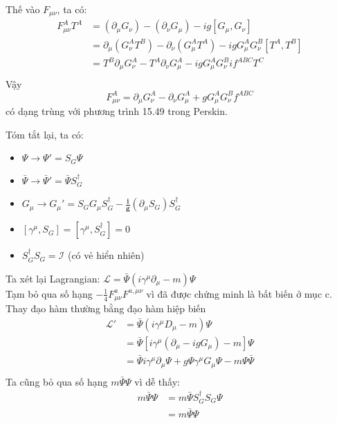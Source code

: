\documentclass[14Pt]{report}
\begin{document}
	Thế vào $F_{\mu\nu}$, ta có:
	\begin{equation}
		\begin{split}
			F_{\mu\nu}^AT^A&=(\partial_\mu G_\nu)-(\partial_\nu G_\mu)-ig\left[G_\mu,G_\nu\right]\\
			&=\partial_\mu (G_\nu^AT^B)-\partial_\nu(G_\mu^AT^A)-igG_\mu^AG_\nu^B\left[T^A,T^B\right]\\
			&=T^B\partial_\mu G_\nu^A-T^A\partial_\nu G_\mu^A-igG_\mu^AG_\nu^Bif^{ABC}T^C\\
		\end{split}
	\end{equation}
	Vậy $$	F_{\mu\nu}^A=\partial_\mu G_\nu^A-\partial_\nu G_\mu^A+gG_\mu^AG_\nu^Bf^{ABC}$$
	có dạng trùng với phương trình 15.49 trong Perskin.
	
	Tóm tắt lại, ta có:
	\begin{itemize}
		\item $\Psi\rightarrow\Psi'=S_G\Psi$
		\item $\bar{\Psi}\rightarrow\bar{\Psi}'=\bar{\Psi}S_G^\dagger$
		\item $G_\mu\rightarrow G_\mu'=S_GG_\mu S_G^\dagger-\frac{\textbf{i}}{\textbf{g}}(\partial_\mu S_G)S_G^\dagger$
		\item $\left[\gamma^\mu,S_G\right]=\left[\gamma^\mu,S_G^\dagger\right]=0$
		\item $S_G^\dagger S_G=\mathcal{I}$ (có vẻ hiển nhiên)
	\end{itemize}
	Ta xét lại Lagrangian:
	$\mathcal{L}=\bar{\Psi}(i\gamma^\mu\partial_\mu-m)\Psi$\\
	Tạm bỏ qua số hạng $-\frac{1}{4}F_{\mu\nu}^aF^{a,\mu\nu}$ vì đã được chứng minh là bất biến ở mục c.
	\\
	Thay đạo hàm thường bằng đạo hàm hiệp biến
	\begin{equation}
		\begin{split}
			\mathcal{L}'&=\bar{\Psi}(i\gamma^\mu D_\mu-m)\Psi\\
			&=\bar{\Psi}[i\gamma^\mu (\partial_\mu-igG_\mu)-m]\Psi\\
			&=\bar{\Psi}i\gamma^\mu \partial_\mu\Psi+g\Psi\gamma^\mu G_\mu\Psi-m\Psi\bar{\Psi}\\
		\end{split}
	\end{equation}
	Ta cũng bỏ qua số hạng $m\bar{\Psi}\Psi$ vì dễ thấy:
	\begin{equation}
		\begin{split}
			m\bar{\Psi}\Psi&=m\bar{\Psi}S_G^\dagger S_G\Psi\\
			&=m\bar{\Psi}\Psi
		\end{split}
	\end{equation}
\end{document}
